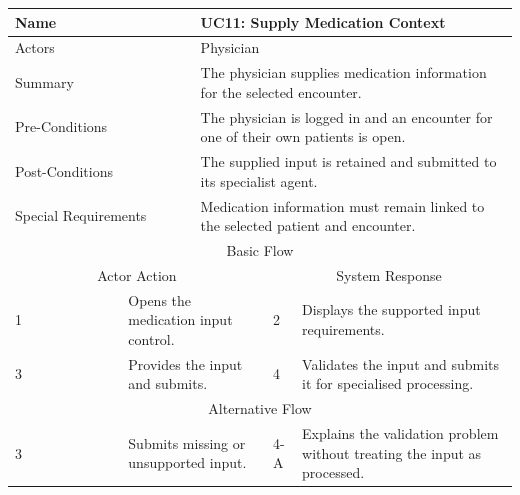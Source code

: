 \begin{reporttable}
\centering
\small
\caption{UC11: Supply Medication Context.}
\label{tab:kashaf:uc11}
\begin{tabular}{|p{}|p{}|p{}|p{}|p{}|}
\hline
\multicolumn{2}{|p{\dimexpr0.225\textwidth+2\tabcolsep+\arrayrulewidth\relax}|}{Name} & \multicolumn{3}{p{\dimexpr0.575\textwidth+4\tabcolsep+2\arrayrulewidth\relax}|}{UC11: Supply Medication Context} \\ \hline
\multicolumn{2}{|p{\dimexpr0.225\textwidth+2\tabcolsep+\arrayrulewidth\relax}|}{Actors} & \multicolumn{3}{p{\dimexpr0.575\textwidth+4\tabcolsep+2\arrayrulewidth\relax}|}{Physician} \\ \hline
\multicolumn{2}{|p{\dimexpr0.225\textwidth+2\tabcolsep+\arrayrulewidth\relax}|}{Summary} & \multicolumn{3}{p{\dimexpr0.575\textwidth+4\tabcolsep+2\arrayrulewidth\relax}|}{The physician supplies medication information for the selected encounter.} \\ \hline
\multicolumn{2}{|p{\dimexpr0.225\textwidth+2\tabcolsep+\arrayrulewidth\relax}|}{Pre-Conditions} & \multicolumn{3}{p{\dimexpr0.575\textwidth+4\tabcolsep+2\arrayrulewidth\relax}|}{The physician is logged in and an encounter for one of their own patients is open.} \\ \hline
\multicolumn{2}{|p{\dimexpr0.225\textwidth+2\tabcolsep+\arrayrulewidth\relax}|}{Post-Conditions} & \multicolumn{3}{p{\dimexpr0.575\textwidth+4\tabcolsep+2\arrayrulewidth\relax}|}{The supplied input is retained and submitted to its specialist agent.} \\ \hline
\multicolumn{2}{|p{\dimexpr0.225\textwidth+2\tabcolsep+\arrayrulewidth\relax}|}{Special Requirements} & \multicolumn{3}{p{\dimexpr0.575\textwidth+4\tabcolsep+2\arrayrulewidth\relax}|}{Medication information must remain linked to the selected patient and encounter.} \\ \hline
\multicolumn{5}{|c|}{Basic Flow} \\ \hline
\multicolumn{3}{|c|}{Actor Action} & \multicolumn{2}{c|}{System Response} \\ \hline
1 & \multicolumn{2}{p{\dimexpr0.37\textwidth+2\tabcolsep+\arrayrulewidth\relax}|}{Opens the medication input control.} & 2 & Displays the supported input requirements. \\ \hline
3 & \multicolumn{2}{p{\dimexpr0.37\textwidth+2\tabcolsep+\arrayrulewidth\relax}|}{Provides the input and submits.} & 4 & Validates the input and submits it for specialised processing. \\ \hline
\multicolumn{5}{|c|}{Alternative Flow} \\ \hline
3 & \multicolumn{2}{p{\dimexpr0.37\textwidth+2\tabcolsep+\arrayrulewidth\relax}|}{Submits missing or unsupported input.} & 4-A & Explains the validation problem without treating the input as processed. \\ \hline
\end{tabular}
\end{reporttable}

